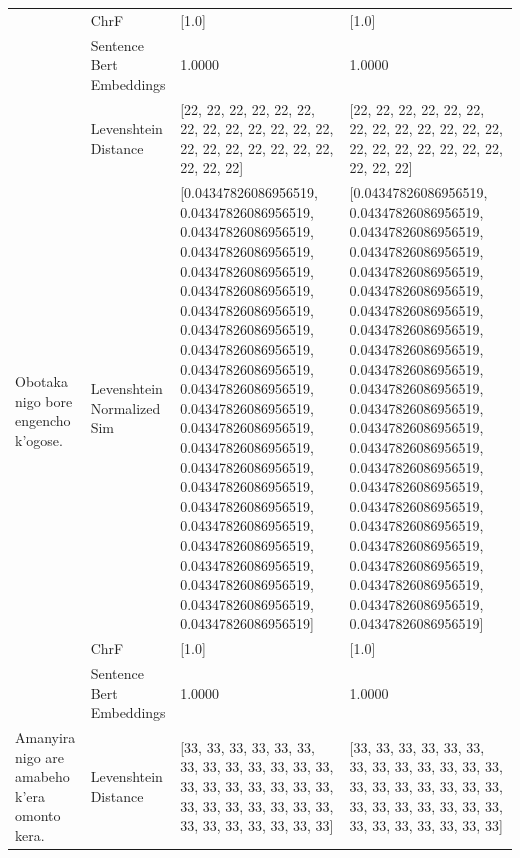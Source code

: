 \begin{tabular}{llll}
 & ChrF & [1.0] & [1.0] \\
 & Sentence Bert Embeddings & 1.0000 & 1.0000 \\
\cline{1-4}
\multirow[t]{4}{*}{Obotaka nigo bore engencho k’ogose.} & Levenshtein Distance & [22, 22, 22, 22, 22, 22, 22, 22, 22, 22, 22, 22, 22, 22, 22, 22, 22, 22, 22, 22, 22, 22, 22] & [22, 22, 22, 22, 22, 22, 22, 22, 22, 22, 22, 22, 22, 22, 22, 22, 22, 22, 22, 22, 22, 22, 22] \\
 & Levenshtein Normalized Sim & [0.04347826086956519, 0.04347826086956519, 0.04347826086956519, 0.04347826086956519, 0.04347826086956519, 0.04347826086956519, 0.04347826086956519, 0.04347826086956519, 0.04347826086956519, 0.04347826086956519, 0.04347826086956519, 0.04347826086956519, 0.04347826086956519, 0.04347826086956519, 0.04347826086956519, 0.04347826086956519, 0.04347826086956519, 0.04347826086956519, 0.04347826086956519, 0.04347826086956519, 0.04347826086956519, 0.04347826086956519, 0.04347826086956519] & [0.04347826086956519, 0.04347826086956519, 0.04347826086956519, 0.04347826086956519, 0.04347826086956519, 0.04347826086956519, 0.04347826086956519, 0.04347826086956519, 0.04347826086956519, 0.04347826086956519, 0.04347826086956519, 0.04347826086956519, 0.04347826086956519, 0.04347826086956519, 0.04347826086956519, 0.04347826086956519, 0.04347826086956519, 0.04347826086956519, 0.04347826086956519, 0.04347826086956519, 0.04347826086956519, 0.04347826086956519, 0.04347826086956519] \\
 & ChrF & [1.0] & [1.0] \\
 & Sentence Bert Embeddings & 1.0000 & 1.0000 \\
\cline{1-4}
\multirow[t]{4}{*}{Amanyira nigo are amabeho k'era omonto kera.} & Levenshtein Distance & [33, 33, 33, 33, 33, 33, 33, 33, 33, 33, 33, 33, 33, 33, 33, 33, 33, 33, 33, 33, 33, 33, 33, 33, 33, 33, 33, 33, 33, 33, 33, 33, 33, 33] & [33, 33, 33, 33, 33, 33, 33, 33, 33, 33, 33, 33, 33, 33, 33, 33, 33, 33, 33, 33, 33, 33, 33, 33, 33, 33, 33, 33, 33, 33, 33, 33, 33, 33] \\

\end{tabular}
